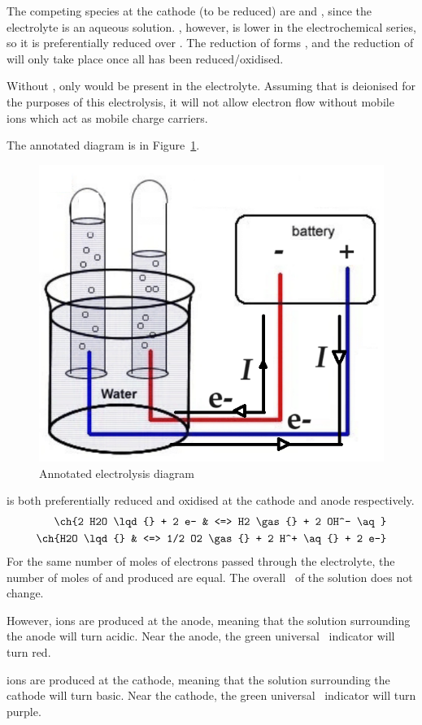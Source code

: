 The competing species at the cathode (to be reduced) are  and , since the electrolyte
is an aqueous solution. , however, is lower in the electrochemical series,
so it is preferentially reduced over . The reduction of 
forms , and the reduction of  will only take place once
all  has been reduced/oxidised.

Without , only  would be present in the electrolyte.
Assuming that  is deionised for the purposes of this electrolysis, it
will not allow electron flow without mobile ions which act as mobile charge carriers.

The annotated diagram is in Figure~\ref{fig:nano3-ans}.

\begin{figure}[htpb]
	\centering
	\includegraphics[width=0.4\linewidth]{assets/09_electrolysis_nano3_ans.png}
	\caption{Annotated electrolysis diagram}
	\label{fig:nano3-ans}
\end{figure}

 is both preferentially reduced and oxidised at the cathode and anode
respectively.
\begin{align*}
	\ch{2 H2O \lqd{} + 2 e- & <=> H2 \gas{} + 2 OH^- \aq}             \\
	\ch{H2O \lqd{}          & <=> 1/2 O2 \gas{} + 2 H^+ \aq{} + 2 e-}
\end{align*}
For the same number of moles of electrons passed through the electrolyte, the
number of moles of  and  produced are equal. The overall \pH\
of the solution does not change.

However,  ions are produced at the anode, meaning that the solution surrounding
the anode will turn {\color{accent} acidic}. {\color{accent} Near the anode, the green universal
\pH\ indicator will turn red}.

 ions are produced at the cathode, meaning that the solution surrounding
the cathode will turn {\color{cobalt} basic}. {\color{cobalt} Near the cathode, the green universal \pH\ indicator will turn purple.}

